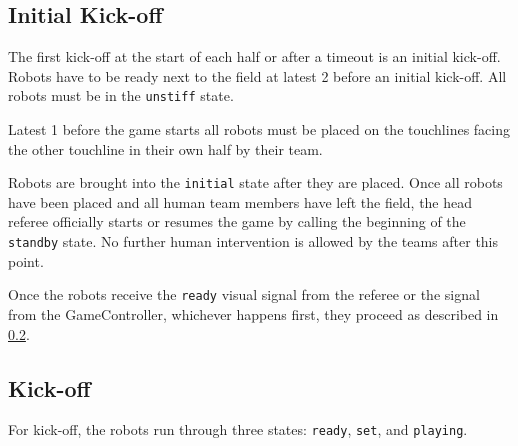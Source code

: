 \subsection{Initial Kick-off}
\label{sec:initial-kick-off}

The first kick-off at the start of each half or after a timeout is an initial kick-off.
Robots have to be ready next to the field at latest \qty{2}{\min} before an initial kick-off.
All robots must be in the \texttt{unstiff} state.

Latest \qty{1}{\min} before the game starts all robots must be placed on the touchlines facing the other touchline in their own half by their team.

Robots are brought into the \texttt{initial} state after they are placed.
Once all robots have been placed and all human team members have left the field, the head referee officially starts or resumes the game by calling the beginning of the \texttt{standby} state.
No further human intervention is allowed by the teams after this point.

Once the robots receive the \texttt{ready} visual signal from the referee or the signal from the GameController, whichever happens first, they proceed as described in \cref{sec:kick-off}.


\subsection{Kick-off}
\label{sec:kick-off}

For kick-off, the robots run through three states: \texttt{ready}, \texttt{set}, and \texttt{playing}.

